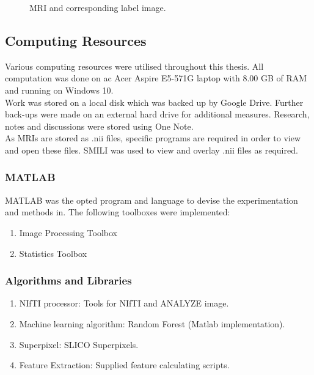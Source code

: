 \begin{figure}[H]
    \centering
    \qquad
    \caption{MRI and corresponding label image.}%
    \label{fig:dataex}
\end{figure}


\subsection{Computing Resources}
Various computing resources were utilised throughout this thesis. All computation was done on ac Acer Aspire E5-571G laptop with 8.00 GB of RAM and running on Windows 10.
\\[1\baselineskip]
Work was stored on a local disk which was backed up by Google Drive. Further back-ups were made on an external hard drive for additional measures. Research, notes and discussions were stored using One Note.
\\[1\baselineskip]
As MRIs are stored as .nii files, specific programs are required in order to view and open these files. SMILI  was used to view and overlay .nii files as required. 
\subsubsection{MATLAB}
MATLAB was the opted program and language to devise the experimentation and methods in. The following toolboxes were implemented:
\begin{enumerate}
	\item Image Processing Toolbox
	\item Statistics Toolbox
\end{enumerate} 
\subsubsection{Algorithms and Libraries}
\begin{enumerate}
	\item  NIfTI processor: Tools for NIfTI and ANALYZE image.
	\item  Machine learning algorithm: Random Forest (Matlab implementation).
	\item  Superpixel: SLICO Superpixels.
	\item  Feature Extraction: Supplied feature calculating scripts. 
\end{enumerate}


